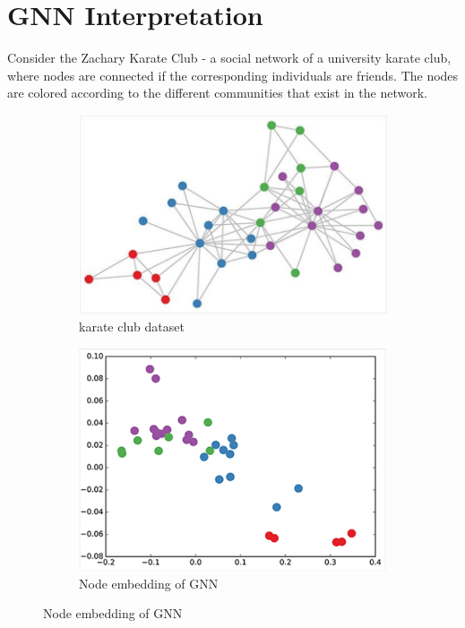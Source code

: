 \section{GNN Interpretation}
    Consider the Zachary Karate Club - a social network of a university karate club, where nodes are connected if the corresponding individuals are friends. The nodes are colored according to the different communities that exist in the network.
    \begin{figure}[h]
    \centering
    \begin{subfigure}[b]{0.5\textwidth}
                \includegraphics[width=\textwidth]{tex/img/dataset.png}
                \caption{karate club dataset}
        \end{subfigure}%
        \hfill
    \begin{subfigure}[b]{0.5\textwidth}
                \includegraphics[width=\textwidth]{tex/img/GEmbed.png}
                \caption{Node embedding of GNN}
       \end{subfigure}%
    \end{figure}
\newpage
